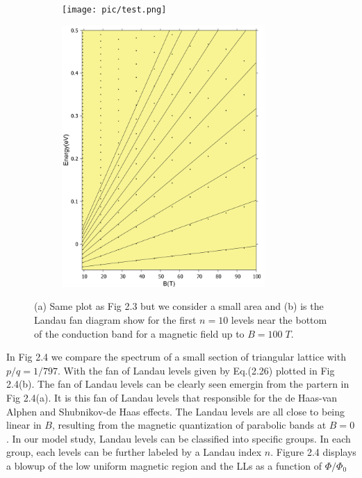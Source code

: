 \documentclass{report}
\begin{document}
\begin{figure}[htb]
	\centering
	\begin{subfigure}[b]{0.49\textwidth}
		\centering
		{\caption{}\label{fig:3 landau level 1}}
		{\texttt{[image: pic/test.png]}}
	\end{subfigure}
	\begin{subfigure}[b]{0.49\textwidth}
		\centering
		\caption{}\label{fig:1 landau level 2}
		\includegraphics[width=0.85\textwidth,height=1.2\linewidth]{pic/landaulevel_h0_q_797.pdf}
	\end{subfigure}
	\caption{
		(a) Same plot as Fig 2.3 but we consider a small area and (b) is the Landau fan diagram show for the first $n = 10$ levels near the bottom of the conduction band for a magnetic field up to $B = 100\; T$.
	}
\end{figure}

In Fig 2.4 we compare the spectrum of a small section of triangular lattice with $p / q = 1 / 797$. With the fan of Landau levels given by Eq.(2.26) plotted in Fig 2.4(b). The fan of Landau levels can be clearly seen emergin from the partern in Fig 2.4(a). It is this fan of Landau levels that responsible for the de Haas-van Alphen and Shubnikov-de Haas effects. \cite{Shoenberg_1984,singleton2001band,blundell2001magnetism,kittel1987quantum} The Landau levels are all close to being linear in $B$, resulting from the magnetic quantization of parabolic bands at $B = 0$. In our model study, Landau levels can be classified into specific groups. In each group, each levels can be further labeled by a Landau index $n$. Figure 2.4 displays a blowup of the low uniform magnetic region and the LLs as a function of $\Phi / \Phi_{0}$ \cite{Li_2011}
\end{document}
